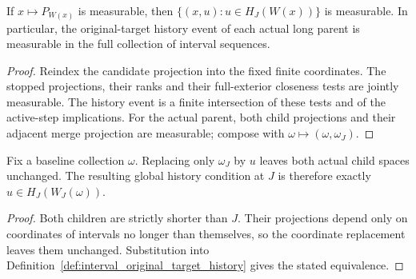 \begin{lemma}
    \label{lem:interval_original_target_history_measurable}
    \leanok
    If $x\mapsto P_{W(x)}$ is measurable, then
    $\{(x,u):u\in H_J(W(x))\}$ is measurable. In particular, the
    original-target history event of each actual long parent is measurable
    in the full collection of interval sequences.
\end{lemma}
\begin{proof}\leanok
    Reindex the candidate projection into the fixed finite coordinates.
    The stopped projections, their ranks and their full-exterior
    closeness tests are jointly measurable. The history event is a finite
    intersection of these tests and of the active-step implications.
    For the actual parent, both child projections and their adjacent
    merge projection are measurable; compose with
    $\omega\mapsto(\omega,\omega_J)$.
\end{proof}

\begin{lemma}
    \label{lem:interval_original_target_history_section}
    \leanok
    Fix a baseline collection $\omega$. Replacing only $\omega_J$ by $u$
    leaves both actual child spaces unchanged. The resulting global
    history condition at $J$ is therefore exactly
    $u\in H_J(W_J(\omega))$.
\end{lemma}
\begin{proof}\leanok
    Both children are strictly shorter than $J$. Their projections depend
    only on coordinates of intervals no longer than themselves, so the
    coordinate replacement leaves them unchanged. Substitution into
    Definition~\ref{def:interval_original_target_history} gives the stated
    equivalence.
\end{proof}


